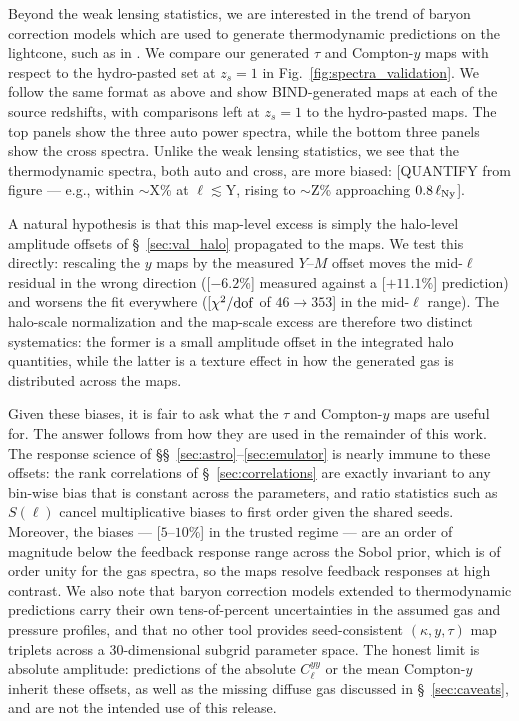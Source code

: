 \documentclass[linenumbers,trackchanges, twocolumn]{aastex701}
\begin{document}
Beyond the weak lensing statistics, we are interested in the trend of baryon correction models which are used to generate thermodynamic predictions on the lightcone, such as in \citep{Anbajagane-2024, Schneider-2025}. We compare our generated $\tau$ and Compton-$y$ maps with respect to the hydro-pasted set at $z_s=1$ in Fig.~\ref{fig:spectra_validation}. We follow the same format as above and show BIND-generated maps at each of the source redshifts, with comparisons left at $z_s=1$ to the hydro-pasted maps. The top panels show the three auto power spectra, while the bottom three panels show the cross spectra. Unlike the weak lensing statistics, we see that the thermodynamic spectra, both auto and cross, are more biased: [QUANTIFY from figure — e.g., within $\sim$X\% at $\ell\lesssim$Y, rising to $\sim$Z\% approaching $0.8\,\ell_{\rm Ny}$].

 
A natural hypothesis is that this map-level excess is simply the halo-level amplitude offsets of \S~\ref{sec:val_halo} propagated to the maps. We test this directly: rescaling the $y$ maps by the measured $Y$--$M$ offset moves the mid-$\ell$ residual in the wrong direction ([$-6.2\%$] measured against a [$+11.1\%$] prediction) and worsens the fit everywhere ([$\chi^2/{\rm dof}$ of $46 \rightarrow 353$] in the mid-$\ell$ range). The halo-scale normalization and the map-scale excess are therefore two distinct systematics: the former is a small amplitude offset in the integrated halo quantities, while the latter is a texture effect in how the generated gas is distributed across the maps.

 
Given these biases, it is fair to ask what the $\tau$ and Compton-$y$ maps are useful for. The answer follows from how they are used in the remainder of this work. The response science of \S\S~\ref{sec:astro}--\ref{sec:emulator} is nearly immune to these offsets: the rank correlations of \S~\ref{sec:correlations} are exactly invariant to any bin-wise bias that is constant across the parameters, and ratio statistics such as $S(\ell)$ cancel multiplicative biases to first order given the shared seeds. Moreover, the biases --- [$5$--$10\%$] in the trusted regime --- are an order of magnitude below the feedback response range across the Sobol prior, which is of order unity for the gas spectra, so the maps resolve feedback responses at high contrast. We also note that baryon correction models extended to thermodynamic predictions carry their own tens-of-percent uncertainties in the assumed gas and pressure profiles, and that no other tool provides seed-consistent $(\kappa, y, \tau)$ map triplets across a 30-dimensional subgrid parameter space. The honest limit is absolute amplitude: predictions of the absolute $C_\ell^{yy}$ or the mean Compton-$y$ inherit these offsets, as well as the missing diffuse gas discussed in \S~\ref{sec:caveats}, and are not the intended use of this release.
\end{document}
